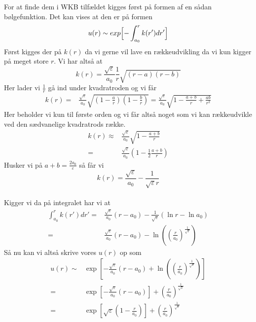 For at finde dem i WKB tilfældet kigges først på formen af en sådan bølgefunktion. Det kan vises at den er på formen %
\begin{equation}
  u(r) \sim exp\Bigl[-\int_{a_0}^{r}k(r')dr'\Bigr]
\end{equation}
Først kigges der på $k(r)$ da vi gerne vil lave en rækkeudvikling da vi kun kigger på meget store $r$.
Vi har altså at
\begin{equation}
  k(r) = \frac{\sqrt{\varepsilon}}{a_0}\frac{1}{r}\sqrt{(r-a)(r-b)}
\end{equation}
Her lader vi $\frac{1}{r}$ gå ind under kvadratroden og vi får
\begin{align}
  k(r) = & \frac{\sqrt{\varepsilon}}{a_0}\sqrt{(1-\frac{a}{r})(1-\frac{b}{r})} = \frac{\sqrt{\varepsilon}}{a_0}\sqrt{1-\frac{a+b}{r}+\frac{ab}{r^2}}
\end{align}
Her beholder vi kun til første orden og vi får altså noget som vi kan rækkeudvikle ved den sædvanelige kvadratrods række.
\begin{align}
  k(r) \approx & \frac{\sqrt{\varepsilon}}{a_0}\sqrt{1-\frac{a+b}{r}}\\
       = & \frac{\sqrt{\varepsilon}}{a_0}(1-\frac{1}{2}\frac{a+b}{r})
\end{align}
Husker vi på $a+b = \frac{2a_0}{\varepsilon}$ så får vi
\begin{equation}
  k(r) = \frac{\sqrt{\varepsilon}}{a_0}-\frac{1}{\sqrt{\varepsilon}r}
\end{equation}
\\
Kigger vi da på integralet har vi at
\begin{align}
  \int_{a_0}^{r}k(r')dr' = & \frac{\sqrt{\varepsilon}}{a_0}(r-a_0) - \frac{1}{\sqrt{\varepsilon}}\left(\ln{r}-\ln{a_0}\right)\\
  = & \frac{\sqrt{\varepsilon}}{a_0}(r-a_0) - \ln{((\frac{r}{a_0})^{\frac{1}{\sqrt{\varepsilon}}})}
\end{align}
%
Så nu kan vi altså skrive vores $u(r)$ op som
\begin{align}
  u(r) \sim & \exp\left[-\frac{\sqrt{\varepsilon}}{a_0}(r-a_0) + \ln{((\frac{r}{a_0})^{\frac{1}{\sqrt{\varepsilon}}})}\right]\\
        = & \exp\left[-\frac{\sqrt{\varepsilon}}{a_0}(r-a_0)\right] + (\frac{r}{a_0})^{\frac{1}{\sqrt{\varepsilon}}}\\
        = & \exp\left[\sqrt{\varepsilon}(1-\frac{r}{a_0})\right] + (\frac{r}{a_0})^{\frac{1}{\sqrt{\varepsilon}}}
\end{align}

